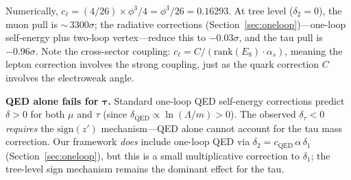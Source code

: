 \documentclass[12pt,a4paper]{article}
\theoremstyle{definition}
\begin{document}
Numerically, $c_\ell = (4/26) \times \phi^3 / 4 = \phi^3/26 = 0.16293$.  At tree level ($\delta_2 = 0$), the muon pull is ${\sim}\,3300\sigma$; the radiative corrections (Section~\ref{sec:oneloop})---one-loop self-energy plus two-loop vertex---reduce this to $-0.03\sigma$, and the tau pull is $-0.96\sigma$.  Note the cross-sector coupling: $c_\ell = C/(\mathrm{rank}(E_8) \cdot \alpha_s)$, meaning the lepton correction involves the strong coupling, just as the quark correction $C$ involves the electroweak angle.

\textbf{QED alone fails for $\boldsymbol{\tau}$.} Standard one-loop QED self-energy corrections predict $\delta > 0$ for both $\mu$ and $\tau$ (since $\delta_{\text{QED}} \propto \ln(\Lambda/m) > 0$). The observed $\delta_\tau < 0$ \emph{requires} the $\mathrm{sign}(z')$ mechanism---QED alone cannot account for the tau mass correction.  Our framework \emph{does} include one-loop QED via $\delta_2 = c_{\text{QED}}\,\alpha\,\delta_1$ (Section~\ref{sec:oneloop}), but this is a small multiplicative correction to $\delta_1$; the tree-level sign mechanism remains the dominant effect for the tau.
\end{document}
